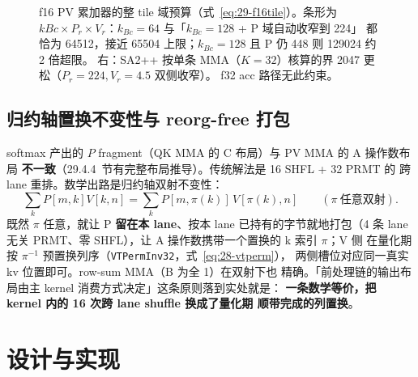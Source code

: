 \begin{figure}[H]
\caption{f16 PV 累加器的整 tile 域预算（式~\ref{eq:29-f16tile}）。条形为
$kBc\times P_r\times V_r$：$k_{Bc}{=}64$ 与「$k_{Bc}{=}128$ + P 域自动收窄到 224」
都恰为 64512，接近 65504 上限；$k_{Bc}{=}128$ 且 P 仍 448 则 129024 约 2 倍超限。
右：SA2++ 按单条 MMA（$K{=}32$）核算的界 2047 更松（$P_r{=}224,V_r{=}4.5$ 双侧收窄）。
f32 acc 路径无此约束。}
\label{fig:29-f16-budget}
\end{figure}

\subsection{归约轴置换不变性与 reorg-free 打包}\label{sec:29-perm}

softmax 产出的 $P$ fragment（QK MMA 的 C 布局）与 PV MMA 的 A 操作数布局
\textbf{不一致}（29.4.4~节有完整布局推导）。传统解法是 16 SHFL + 32 PRMT 的
跨 lane 重排。数学出路是归约轴双射不变性：
\begin{equation}
  \sum_k P[m,k]V[k,n]=\sum_k P[m,\pi(k)]\,V[\pi(k),n]
  \qquad(\pi\ \text{任意双射}) .
  \label{eq:29-perm-inv}
\end{equation}
既然 $\pi$ 任意，就让 P \textbf{留在本 lane}、按本 lane 已持有的字节就地打包（4 条
lane 无关 PRMT、零 SHFL），让 A 操作数携带一个置换的 k 索引 $\pi$；V 侧
在量化期按 $\pi^{-1}$ 预置换列序（\texttt{VTPermInv32}，式~\ref{eq:28-vtperm}），
两侧槽位对应同一真实 kv 位置即可。row-sum MMA（B 为全 1）在双射下也
精确。「前处理链的输出布局由主 kernel 消费方式决定」这条原则落到实处就是：
\textbf{一条数学等价，把 kernel 内的 16 次跨 lane shuffle 换成了量化期
顺带完成的列置换}。

\section{设计与实现}

